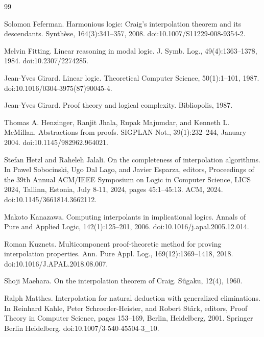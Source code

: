 \documentclass[10pt,a4paper]{article}
\begin{document}
\begin{thebibliography}{99}
\par\noindent    Solomon Feferman.  Harmonious logic: Craig’s interpolation theorem and its descendants.  Synthèse, 164(3):341–357, 2008.  doi:10.1007/S11229-008-9354-2.  

\par\noindent    Melvin Fitting.  Linear reasoning in modal logic.  J. Symb. Log., 49(4):1363–1378, 1984.  doi:10.2307/2274285.  

\par\noindent    Jean-Yves Girard.  Linear logic.  Theoretical Computer Science, 50(1):1–101, 1987.  doi:10.1016/0304-3975(87)90045-4.  

\par\noindent    Jean-Yves Girard.  Proof theory and logical complexity.  Bibliopolis, 1987.  

\par\noindent    Thomas A. Henzinger, Ranjit Jhala, Rupak Majumdar, and Kenneth L. McMillan.  Abstractions from proofs.  SIGPLAN Not., 39(1):232–244, January 2004.  doi:10.1145/982962.964021.  

\par\noindent    Stefan Hetzl and Raheleh Jalali.  On the completeness of interpolation algorithms.  In Pawel Sobocinski, Ugo Dal Lago, and Javier Esparza, editors, Proceedings of the 39th Annual ACM/IEEE Symposium on Logic in Computer Science, LICS 2024, Tallinn, Estonia, July 8-11, 2024, pages 45:1–45:13. ACM, 2024.  doi:10.1145/3661814.3662112.  

\par\noindent    Makoto Kanazawa.  Computing interpolants in implicational logics.  Annals of Pure and Applied Logic, 142(1):125–201, 2006.  doi:10.1016/j.apal.2005.12.014.  

\par\noindent    Roman Kuznets.  Multicomponent proof-theoretic method for proving interpolation properties.  Ann. Pure Appl. Log., 169(12):1369–1418, 2018.  doi:10.1016/J.APAL.2018.08.007.  

\par\noindent    Shoji Maehara.  On the interpolation theorem of Craig.  Sûgaku, 12(4), 1960.  

\par\noindent    Ralph Matthes.  Interpolation for natural deduction with generalized eliminations.  In Reinhard Kahle, Peter Schroeder-Heister, and Robert Stärk, editors, Proof Theory in Computer Science, pages 153–169, Berlin, Heidelberg, 2001. Springer Berlin Heidelberg.  doi:10.1007/3-540-45504-3\_10.  


\end{thebibliography}
\end{document}
